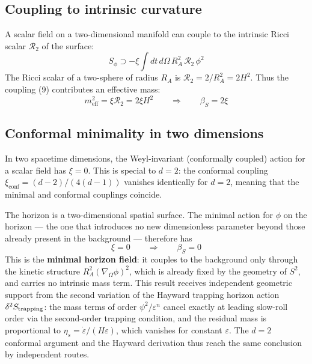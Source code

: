 \documentclass[12pt,a4paper]{article}
\begin{document}
\subsection{Coupling to intrinsic curvature}

A scalar field on a two-dimensional manifold can couple to the intrinsic Ricci scalar $\mathcal{R}_2$ of the surface:
\begin{equation}
S_\phi \supset -\xi \int dt\, d\Omega\, R_A^2\, \mathcal{R}_2\, \phi^2 \tag{9}
\end{equation}
The Ricci scalar of a two-sphere of radius $R_A$ is $\mathcal{R}_2 = 2/R_A^2 = 2H^2$. Thus the coupling (9) contributes an effective mass:
\begin{equation}
m_\text{eff}^2 = \xi \mathcal{R}_2 = 2\xi H^2 \qquad \Longrightarrow \qquad \beta_S = 2\xi \tag{10}
\end{equation}

\subsection{Conformal minimality in two dimensions}

In two spacetime dimensions, the Weyl-invariant (conformally coupled) action for a scalar field has $\xi = 0$. This is special to $d=2$: the conformal coupling $\xi_\text{conf} = (d-2)/(4(d-1))$ vanishes identically for $d=2$, meaning that the minimal and conformal couplings coincide.

The horizon is a two-dimensional spatial surface. The minimal action for $\phi$ on the horizon --- the one that introduces no new dimensionless parameter beyond those already present in the background --- therefore has
\begin{equation}
\xi = 0 \qquad \Longrightarrow \qquad \beta_S = 0 \tag{11}
\end{equation}
This is the \textbf{minimal horizon field}: it couples to the background only through the kinetic structure $R_A^2(\nabla_\Omega\phi)^2$, which is already fixed by the geometry of $S^2$, and carries no intrinsic mass term. This result receives independent geometric support from the second variation of the Hayward trapping horizon action $\delta^2 S_{\rm trapping}$: the mass terms of order $\psi^2/\varepsilon^n$ cancel exactly at leading slow-roll order via the second-order trapping condition, and the residual mass is proportional to $\eta_s = \dot\varepsilon/(H\varepsilon)$, which vanishes for constant $\varepsilon$. The $d=2$ conformal argument and the Hayward derivation thus reach the same conclusion by independent routes.
\end{document}
